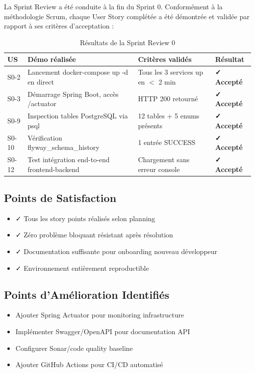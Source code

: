 \documentclass[12pt,a4paper]{report}
\begin{document}
La Sprint Review a été conduite à la fin du Sprint 0. Conformément à la méthodologie Scrum, chaque User Story complétée a été démontrée et validée par rapport à ses critères d'acceptation :

\begin{table}[H]
\centering
\caption{Résultats de la Sprint Review 0}
\begin{tabular}{|p{1cm}|p{5cm}|p{4cm}|p{3.5cm}|}
\hline
\textbf{US} & \textbf{Démo réalisée} & \textbf{Critères validés} & \textbf{Résultat} \\
\hline
S0-2 & Lancement docker-compose up -d en direct & Tous les 3 services up en $<$ 2 min & \textbf{✓ Accepté} \\
\hline
S0-3 & Démarrage Spring Boot, accès /actuator & HTTP 200 retourné & \textbf{✓ Accepté} \\
\hline
S0-9 & Inspection tables PostgreSQL via psql & 12 tables + 5 enums présents & \textbf{✓ Accepté} \\
\hline
S0-10 & Vérification flyway\_schema\_history & 1 entrée SUCCESS & \textbf{✓ Accepté} \\
\hline
S0-12 & Test intégration end-to-end frontend-backend & Chargement sans erreur console & \textbf{✓ Accepté} \\
\hline
\end{tabular}
\end{table}

\subsection{Points de Satisfaction}

\begin{itemize}[itemsep=0.3em]
    \item ✓ Tous les story points réalisés selon planning
    \item ✓ Zéro problème bloquant résistant après résolution
    \item ✓ Documentation suffisante pour onboarding nouveau développeur
    \item ✓ Environnement entièrement reproductible
\end{itemize}

\subsection{Points d'Amélioration Identifiés}

\begin{itemize}[itemsep=0.3em]
    \item Ajouter Spring Actuator pour monitoring infrastructure
    \item Implémenter Swagger/OpenAPI pour documentation API
    \item Configurer Sonar/code quality baseline
    \item Ajouter GitHub Actions pour CI/CD automatisé
\end{itemize}
\end{document}
